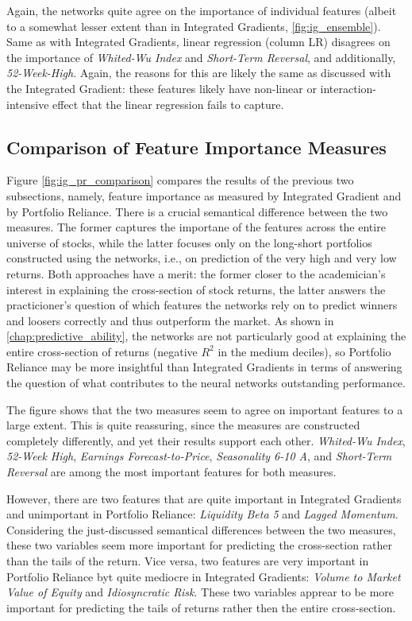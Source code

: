 {		Again, the networks quite agree on the importance of individual features (albeit to a somewhat lesser extent than in Integrated Gradients, \ref{fig:ig_ensemble}). Same as with Integrated Gradients, linear regression (column LR) disagrees on the importance of \textit{Whited-Wu Index} and \textit{Short-Term Reversal}, and additionally, \textit{52-Week-High}. Again, the reasons for this are likely the same as discussed with the Integrated Gradient: these features likely have non-linear or interaction-intensive effect that the linear regression fails to capture.    
		
	\subsection{Comparison of Feature Importance Measures} 	

	Figure \ref{fig:ig_pr_comparison} compares the results of the previous two subsections, namely, feature importance as measured by Integrated Gradient and by Portfolio Reliance. There is a crucial semantical difference between the two measures. The former captures the importane of the features across the entire universe of stocks, while the latter focuses only on the long-short portfolios constructed using the networks, i.e., on prediction of the very high and very low returns. Both approaches have a merit: the former closer to the academician's interest in explaining the cross-section of stock returns, the latter answers the practicioner's question of which features the networks rely on to predict winners and loosers correctly and thus outperform the market. As shown in \ref{chap:predictive_ability}, the networks are not particularly good at explaining the entire cross-section of returns (negative $R^2$ in the medium deciles), so Portfolio Reliance may be more insightful than Integrated Gradients in terms of answering the question of what contributes to the neural networks outstanding performance.

	The figure shows that the two measures seem to agree on important features to a large extent. This is quite reassuring, since the measures are constructed completely differently, and yet their results support each other. \textit{Whited-Wu Index}, \textit{52-Week High}, \textit{Earnings Forecast-to-Price}, \textit{Seasonality 6-10 A}, and \textit{Short-Term Reversal} are among the most important features for both measures. 
	
	However, there are two features that are quite important in Integrated Gradients and unimportant in Portfolio Reliance: \textit{Liquidity Beta 5} and \textit{Lagged Momentum}. Considering the just-discussed semantical differences between the two measures, these two variables seem more important for predicting the cross-section rather than the tails of the return. Vice versa, two features are very important in Portfolio Reliance byt quite mediocre in Integrated Gradients: \textit{Volume to Market Value of Equity} and \textit{Idiosyncratic Risk}. These two variables apprear to be more important for predicting the tails of returns rather then the entire cross-section. 
	
}

